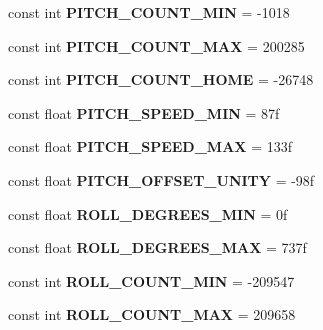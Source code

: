\begin{DoxyCompactItemize}
const int {\bfseries P\+I\+T\+C\+H\+\_\+\+C\+O\+U\+N\+T\+\_\+\+M\+IN} = -\/1018
\item 
\mbox{\label{class_scorbot_e_r_i_x_a108c08642b2dccbd48e7c5585c65726c}} 
const int {\bfseries P\+I\+T\+C\+H\+\_\+\+C\+O\+U\+N\+T\+\_\+\+M\+AX} = 200285
\item 
\mbox{\label{class_scorbot_e_r_i_x_adee0034426113ad105bbda04aa5da409}} 
const int {\bfseries P\+I\+T\+C\+H\+\_\+\+C\+O\+U\+N\+T\+\_\+\+H\+O\+ME} = -\/26748
\item 
\mbox{\label{class_scorbot_e_r_i_x_a270f6ad77571bd64655e0bb6329792fe}} 
const float {\bfseries P\+I\+T\+C\+H\+\_\+\+S\+P\+E\+E\+D\+\_\+\+M\+IN} = 87f
\item 
\mbox{\label{class_scorbot_e_r_i_x_a5ca94c84b6cd6544a714c421b3aba5fb}} 
const float {\bfseries P\+I\+T\+C\+H\+\_\+\+S\+P\+E\+E\+D\+\_\+\+M\+AX} = 133f
\item 
\mbox{\label{class_scorbot_e_r_i_x_af2e1067edc54fb44ca8bffb5cf03ca72}} 
const float {\bfseries P\+I\+T\+C\+H\+\_\+\+O\+F\+F\+S\+E\+T\+\_\+\+U\+N\+I\+TY} = -\/98f
\item 
\mbox{\label{class_scorbot_e_r_i_x_accf0e376abade49acc20a535de2f1c8f}} 
const float {\bfseries R\+O\+L\+L\+\_\+\+D\+E\+G\+R\+E\+E\+S\+\_\+\+M\+IN} = 0f
\item 
\mbox{\label{class_scorbot_e_r_i_x_a57eb1a952954a936ef9c3c9032762078}} 
const float {\bfseries R\+O\+L\+L\+\_\+\+D\+E\+G\+R\+E\+E\+S\+\_\+\+M\+AX} = 737f
\item 
\mbox{\label{class_scorbot_e_r_i_x_aa8eafd3a427f306fceaa8a251f46ca8f}} 
const int {\bfseries R\+O\+L\+L\+\_\+\+C\+O\+U\+N\+T\+\_\+\+M\+IN} = -\/209547
\item 
\mbox{\label{class_scorbot_e_r_i_x_a2e0e51d09505d42702c453484ee4b87e}} 
const int {\bfseries R\+O\+L\+L\+\_\+\+C\+O\+U\+N\+T\+\_\+\+M\+AX} = 209658
\item 
\mbox{\label{class_scorbot_e_r_i_x_a409cfc91d430fcfd55de2436cd6e2358}} 

\end{DoxyCompactItemize}
